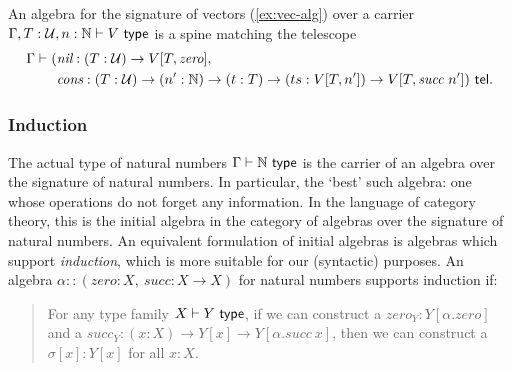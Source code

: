 \begin{example}[Vectors]\label{ex:vec-alg}
An algebra for the signature of vectors (\cref{ex:vec-alg}) over a carrier $\Gamma, T : \mathcal{U}, n : \mathbb{N} \vdash V \ \textsf{type}$ is a spine matching
the telescope
\begin{align*}
 \Gamma \vdash (&\textit{nil} : (T : \mathcal{U}) \to V[T, \textit{zero}], \\
&\textit{cons} : (T : \mathcal{U}) \to (n' : \mathbb{N}) \to (t : T) \to (ts : V[T,n']) \to V[T, \textit{succ}\ n']) \ \textsf{tel}.
\end{align*}
\end{example}

\subsubsection{Induction}

The actual type of natural numbers $\Gamma \vdash \mathbb{N} \ \textsf{type}$ is the
carrier of an algebra over the signature of natural numbers. In particular, the
`best' such algebra: one whose operations do not forget any information. In the
language of category theory, this is the initial algebra in the category of
algebras over the signature of natural numbers. An equivalent formulation of
initial algebras is algebras which support \emph{induction}, which is more
suitable for our (syntactic) purposes. An algebra $\alpha :: (\textit{zero}: X,\
\textit{succ}: X \to X)$ for natural numbers supports induction if:

\begin{quote}
For any type family $X \vdash Y \ \textsf{type}$, if we can construct a $\textit{zero}_Y :
Y[\alpha.\textit{zero}]$ and a $\textit{succ}_Y : (x : X) \to Y[x] \to
Y[\alpha.\textit{succ}\ x]$, then we can construct a $\sigma[x] : Y[x]$ for all
$x : X$.
\end{quote}

